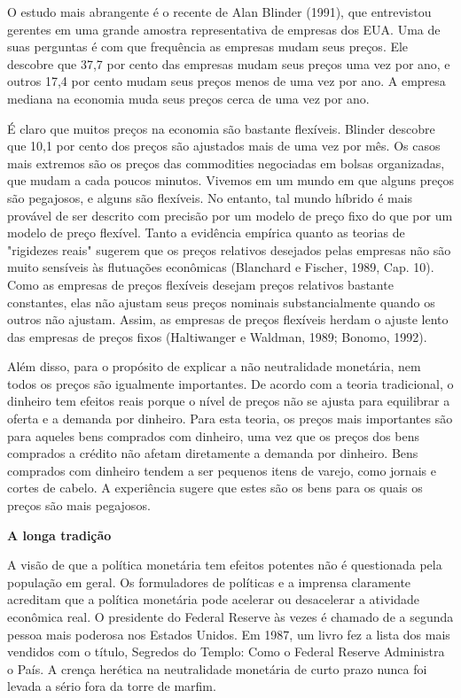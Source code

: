 \documentclass[12pt]{article}
\begin{document}
O estudo mais abrangente é o recente de Alan Blinder (1991), que entrevistou gerentes em uma grande amostra representativa de empresas dos EUA. Uma de suas perguntas é com que frequência as empresas mudam seus preços. Ele descobre que 37,7 por cento das empresas mudam seus preços uma vez por ano, e outros 17,4 por cento mudam seus preços menos de uma vez por ano. A empresa mediana na economia muda seus preços cerca de uma vez por ano.

É claro que muitos preços na economia são bastante flexíveis. Blinder descobre que 10,1 por cento dos preços são ajustados mais de uma vez por mês. Os casos mais extremos são os preços das commodities negociadas em bolsas organizadas, que mudam a cada poucos minutos. Vivemos em um mundo em que alguns preços são pegajosos, e alguns são flexíveis. No entanto, tal mundo híbrido é mais provável de ser descrito com precisão por um modelo de preço fixo do que por um modelo de preço flexível. Tanto a evidência empírica quanto as teorias de "rigidezes reais" sugerem que os preços relativos desejados pelas empresas não são muito sensíveis às flutuações econômicas (Blanchard e Fischer, 1989, Cap. 10). Como as empresas de preços flexíveis desejam preços relativos bastante constantes, elas não ajustam seus preços nominais substancialmente quando os outros não ajustam. Assim, as empresas de preços flexíveis herdam o ajuste lento das empresas de preços fixos (Haltiwanger e Waldman, 1989; Bonomo, 1992).

Além disso, para o propósito de explicar a não neutralidade monetária, nem todos os preços são igualmente importantes. De acordo com a teoria tradicional, o dinheiro tem efeitos reais porque o nível de preços não se ajusta para equilibrar a oferta e a demanda por dinheiro. Para esta teoria, os preços mais importantes são para aqueles bens comprados com dinheiro, uma vez que os preços dos bens comprados a crédito não afetam diretamente a demanda por dinheiro. Bens comprados com dinheiro tendem a ser pequenos itens de varejo, como jornais e cortes de cabelo. A experiência sugere que estes são os bens para os quais os preços são mais pegajosos.

\textbf{A longa tradição}

A visão de que a política monetária tem efeitos potentes não é questionada pela população em geral. Os formuladores de políticas e a imprensa claramente acreditam que a política monetária pode acelerar ou desacelerar a atividade econômica real. O presidente do Federal Reserve às vezes é chamado de a segunda pessoa mais poderosa nos Estados Unidos. Em 1987, um livro fez a lista dos mais vendidos com o título, Segredos do Templo: Como o Federal Reserve Administra o País. A crença herética na neutralidade monetária de curto prazo nunca foi levada a sério fora da torre de marfim.
\end{document}
